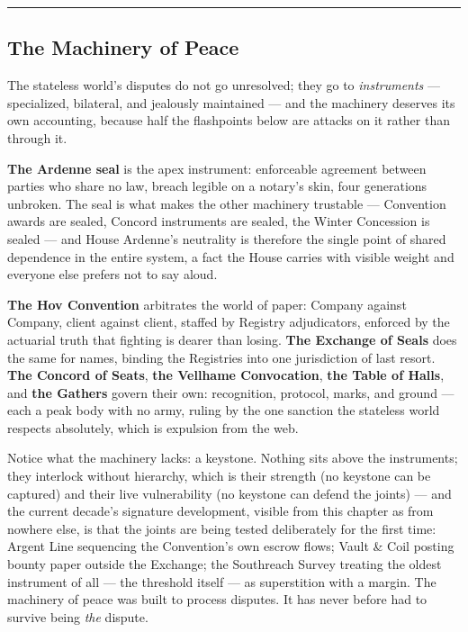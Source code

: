 \medskip\hrule\medskip

\subsection{The Machinery of Peace}

The stateless world's disputes do not go unresolved; they go to \textit{instruments} --- specialized, bilateral, and jealously maintained --- and the machinery deserves its own accounting, because half the flashpoints below are attacks on it rather than through it.

\textbf{The Ardenne seal} is the apex instrument: enforceable agreement between parties who share no law, breach legible on a notary's skin, four generations unbroken. The seal is what makes the other machinery trustable --- Convention awards are sealed, Concord instruments are sealed, the Winter Concession is sealed --- and House Ardenne's neutrality is therefore the single point of shared dependence in the entire system, a fact the House carries with visible weight and everyone else prefers not to say aloud.

\textbf{The Hov Convention} arbitrates the world of paper: Company against Company, client against client, staffed by Registry adjudicators, enforced by the actuarial truth that fighting is dearer than losing. \textbf{The Exchange of Seals} does the same for names, binding the Registries into one jurisdiction of last resort. \textbf{The Concord of Seats}, \textbf{the Vellhame Convocation}, \textbf{the Table of Halls}, and \textbf{the Gathers} govern their own: recognition, protocol, marks, and ground --- each a peak body with no army, ruling by the one sanction the stateless world respects absolutely, which is expulsion from the web.

Notice what the machinery lacks: a keystone. Nothing sits above the instruments; they interlock without hierarchy, which is their strength (no keystone can be captured) and their live vulnerability (no keystone can defend the joints) --- and the current decade's signature development, visible from this chapter as from nowhere else, is that the joints are being tested deliberately for the first time: Argent Line sequencing the Convention's own escrow flows; Vault \& Coil posting bounty paper outside the Exchange; the Southreach Survey treating the oldest instrument of all --- the threshold itself --- as superstition with a margin. The machinery of peace was built to process disputes. It has never before had to survive being \textit{the} dispute.

